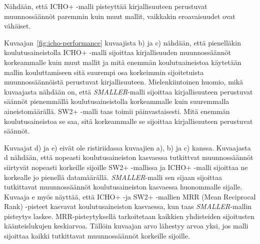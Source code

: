 \documentclass[finnish,twoside,censored,tkt,sw-line]{HYthesisML}
\begin{document}
Nähdään, että ICHO+ -malli pisteyttää kirjallisuuteen perustuvat muunnossäännöt paremmin kuin muut mallit, vaikkakin eroavaisuudet ovat vähäiset.

Kuvaajan~\ref{fig:icho-performance} kuvaajista b) ja c) nähdään, että pienelläkin koulutusaineistolla ICHO+ -malli sijoittaa kirjallisuuden muunnossäännöt korkeammalle kuin muut mallit ja mitä enemmän koulutuaineistoa käytetään mallin kouluttamiseen sitä suurempi osa korkeimmin sijoitetuista muunnossäännöistä perustuvat kirjallisuuteen.
Mielenkiintoinen huomio, mikä kuvaajasta nähdään on, että \emph{SMALLER}-malli sijoittaa kirjallisuuteen perustuvat säännöt pienemmällä koulutusaineistolla korkeammalle kuin suuremmalla aineistomäärällä.
SW2+ -malli taas toimii päinvastaisesti.
Mitä enemmän koulutusaineistoa se saa, sitä korkeammalle se sijoittaa kirjallisuuteen perustuvat säännöt.

Kuvaajat d) ja e) eivät ole ristiriidassa kuvaajien a), b) ja c) kanssa.
Kuvaajasta d nähdään, että nopeasti koulutusaineiston kasvaessa tutkittvat muunnossäännöt siirtyvät nopeasti korkeille sijoille SW2+ -mallissa ja ICHO+ -malli sijoittaa ne korkealle jo pienellä datamäärällä.
\emph{SMALLER}-malli sen sijaan sijoittaa tutkittavat muunnossäännöt koulutusaineiston kasvaessa huonommalle sijalle.
Kuvaaja e myös näyttää, että ICHO+ -ja SW2+ -mallien MRR (Mean Reciprocal Rank) -pisteet kasvavat koulutusaineiston kasvaessa, kun taas \emph{SMALLER}-mallin pisteytys laskee.
MRR-pisteytyksellä tarkoitetaan kaikkien yhdisteiden sijoitusten käänteislukujen keskiarvoa.
Tällöin kuvaajan arvo lähestyy arvoa yksi, jos malli sijoittaa kaikki tutkittavat muunnossäännöt korkeille sijoille.
\end{document}
